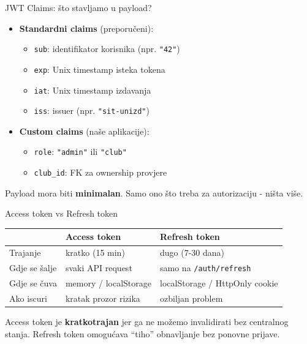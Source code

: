 \begin{frame}{JWT Claims: što stavljamo u payload?}
	\begin{itemize}
		\item \textbf{Standardni claims} (preporučeni):
		\begin{itemize}
			\item \texttt{sub}: identifikator korisnika (npr. \texttt{"42"})
			\item \texttt{exp}: Unix timestamp isteka tokena
			\item \texttt{iat}: Unix timestamp izdavanja
			\item \texttt{iss}: issuer (npr. \texttt{"sit-unizd"})
		\end{itemize}
		\item \textbf{Custom claims} (naše aplikacije):
		\begin{itemize}
			\item \texttt{role}: \texttt{"admin"} ili \texttt{"club"}
			\item \texttt{club\_id}: FK za ownership provjere
		\end{itemize}
	\end{itemize}

	\vspace{0.6em}
	Payload mora biti \textbf{minimalan}. Samo ono što treba za autorizaciju - ništa više.
\end{frame}

\begin{frame}{Access token vs Refresh token}
	\begin{tabular}{@{}lll@{}}
		\toprule
		& \textbf{Access token} & \textbf{Refresh token} \\
		\midrule
		Trajanje        & kratko (15 min)       & dugo (7-30 dana) \\
		Gdje se šalje   & svaki API request     & samo na \texttt{/auth/refresh} \\
		Gdje se čuva    & memory / localStorage & localStorage / HttpOnly cookie \\
		Ako iscuri      & kratak prozor rizika  & ozbiljan problem \\
		\bottomrule
	\end{tabular}

	\vspace{0.6em}
	Access token je \textbf{kratkotrajan} jer ga ne možemo invalidirati bez centralnog stanja.
	Refresh token omogućava \enquote{tiho} obnavljanje bez ponovne prijave.
\end{frame}

